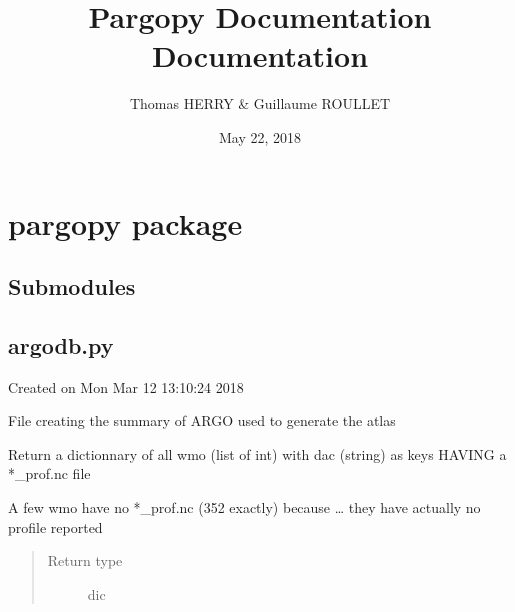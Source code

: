 \documentclass[letterpaper,10pt,english]{sphinxmanual}
\title{Pargopy Documentation Documentation}
\date{May 22, 2018}
\author{Thomas HERRY \& Guillaume ROULLET}
\begin{document}
\maketitle
\sphinxtableofcontents
{}\label{\detokenize{index::doc}}



\chapter{pargopy package}
\label{\detokenize{pargopy:welcome-to-pargopy-s-documentation}}\label{\detokenize{pargopy:pargopy-package}}\label{\detokenize{pargopy::doc}}

\section{Submodules}
\label{\detokenize{pargopy:submodules}}

\section{argodb.py}
\label{\detokenize{pargopy:module-pargopy.argodb}}\label{\detokenize{pargopy:argodb-py}}
Created on Mon Mar 12 13:10:24 2018

File creating the summary of ARGO used to generate the atlas

\begin{fulllineitems}
\label{\detokenize{pargopy:pargopy.argodb.get_all_wmos}}
Return a dictionnary of all wmo (list of int) with dac (string) as
keys HAVING a *\_prof.nc file

A few wmo have no *\_prof.nc (352 exactly) because … they have
actually no profile reported
\begin{quote}\begin{description}
\item[{Return type}] \leavevmode
dic

\end{description}\end{quote}

\end{fulllineitems}

\end{document}
